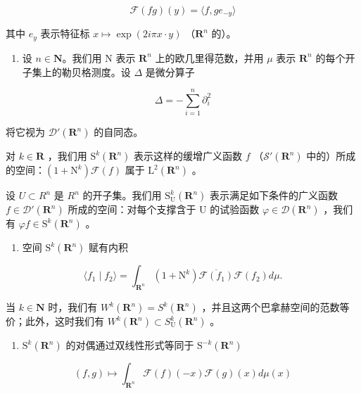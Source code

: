 \[
\mathcal {F} (f g) (y) = \langle f, g e _ {- y} \rangle
\]

其中 \(e_y\) 表示特征标 \(x \mapsto \exp(2i\pi x \cdot y)\) （\(\mathbf{R}^n\) 的）。

\begin{enumerate}
\def\labelenumi{\arabic{enumi})}
\setcounter{enumi}{26}
\tightlist
\item
  设 \(n \in \mathbf{N}\)。我们用 N 表示 \(\mathbf{R}^{n}\) 上的欧几里得范数，并用 \(\mu\) 表示 \(\mathbf{R}^{n}\) 的每个开子集上的勒贝格测度。设 \(\Delta\) 是微分算子
\end{enumerate}

\[
\Delta = - \sum_ {i = 1} ^ {n} \partial_ {i} ^ {2}
\]

将它视为 \(\mathcal{D}'(\mathbf{R}^{n})\) 的自同态。

对 \(k \in \mathbf{R}\) ，我们用 \(\mathrm{S}^k(\mathbf{R}^n)\) 表示这样的缓增广义函数 \(f\) （\(\mathcal{S}'(\mathbf{R}^n)\) 中的）所成的空间：\((1 + \mathrm{N}^k)\mathcal{F}(f)\) 属于 \(\mathrm{L}^2(\mathbf{R}^n)\) 。

设 \(U \subset R^{n}\) 是 \(R^{n}\) 的开子集。我们用 \(\mathrm{S}_{\mathrm{U}}^{k}(\mathbf{R}^{n})\) 表示满足如下条件的广义函数 \(f \in \mathcal{D}'(\mathbf{R}^{n})\) 所成的空间：对每个支撑含于 U 的试验函数 \(\varphi \in \mathcal{D}(\mathbf{R}^{n})\) ，我们有 \(\varphi f \in \mathrm{S}^{k}(\mathbf{R}^{n})\) 。

\begin{enumerate}
\def\labelenumi{\alph{enumi})}
\tightlist
\item
  空间 \(\mathrm{S}^{k}(\mathbf{R}^{n})\) 赋有内积
\end{enumerate}

\[
\langle f _ {1} \mid f _ {2} \rangle = \int_ {\mathbf {R} ^ {n}} (1 + \mathrm{N} ^ {k}) \overline {{\mathcal {F} (f _ {1})}} \mathcal {F} (f _ {2}) d \mu .
\]

当 \(k \in \mathbf{N}\) 时，我们有 \(W^{k}(\mathbf{R}^{n}) = S^{k}(\mathbf{R}^{n})\) ，并且这两个巴拿赫空间的范数等价；此外，这时我们有 \(W^{k}(\mathbf{R}^{n}) \subset S_{\mathrm{U}}^{k}(\mathbf{R}^{n})\) 。

\begin{enumerate}
\def\labelenumi{\alph{enumi})}
\setcounter{enumi}{1}
\tightlist
\item
  \(\mathrm{S}^{k}(\mathbf{R}^{n})\) 的对偶通过双线性形式等同于 \(\mathrm{S}^{-k}(\mathbf{R}^{n})\)
\end{enumerate}

\[
(f, g) \mapsto \int_ {\mathbf {R} ^ {n}} \mathcal {F} (f) (- x) \mathcal {F} (g) (x) d \mu (x)
\]

